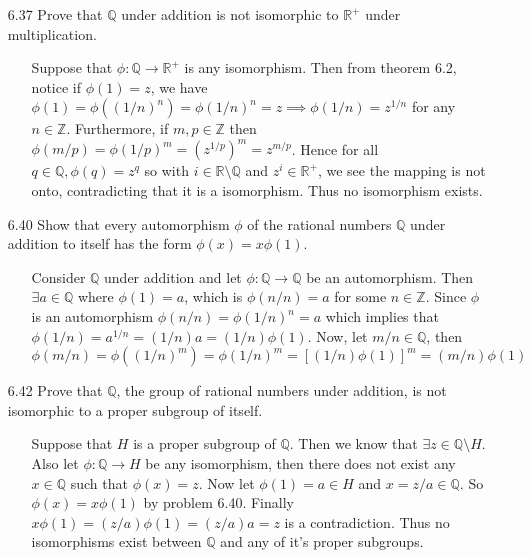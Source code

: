 \documentclass[12pt]{article}
\begin{document}
\begin{enumerate}
\item[6.37] Prove that $\mathbb{Q}$ under addition is not isomorphic to $\mathbb{R}^+$ under
multiplication.
\begin{enumerate}
\item[] Suppose that $\phi: \mathbb{Q} \rightarrow \mathbb{R}^+$ is any isomorphism. Then from
theorem 6.2, notice if $\phi(1) = z$, we have $\phi(1) = \phi((1/n)^n) = \phi(1/n)^n = z 
\implies \phi(1/n) = z^{1/n}$ for any $n \in \mathbb{Z}$. Furthermore, if $m, p \in \mathbb{Z}$
then $\phi(m/p) = \phi(1/p)^m = (z^{1/p})^m = z^{m/p}$. Hence for all $q \in \mathbb{Q}, 
\phi(q) = z^q$ so with $i \in \mathbb{R}\setminus \mathbb{Q}$ and $z^i \in \mathbb{R}^+$, we
see the mapping is not onto, contradicting that it is a isomorphism. Thus no isomorphism exists.
\end{enumerate}

\item[6.40] Show that every automorphism $\phi$ of the rational numbers $\mathbb{Q}$ under addition
to itself has the form $\phi(x) = x\phi(1)$.
\begin{enumerate}
\item[] Consider $\mathbb{Q}$ under addition and let $\phi: \mathbb{Q} \rightarrow \mathbb{Q}$
be an automorphism. Then $\exists a \in \mathbb{Q}$ where $\phi(1) = a$, which is
$\phi(n/n) = a$ for some $n \in \mathbb{Z}$. Since $\phi$ is an automorphism $\phi(n/n) = 
\phi(1/n)^n = a$ which implies that $\phi(1/n) = a^{1/n} = (1/n)a = (1/n)\phi(1)$. Now,
let $m/n \in \mathbb{Q}$, then
\[
\phi(m/n) = \phi((1/n)^m) = \phi(1/n)^m = [(1/n)\phi(1)]^m = (m/n)\phi(1)
\]
\end{enumerate}

\item[6.42] Prove that $\mathbb{Q}$, the group of rational numbers under addition, is not isomorphic to a proper subgroup of itself.
\begin{enumerate}
\item[] Suppose that $H$ is a proper subgroup of $\mathbb{Q}$. Then we know that
$\exists z \in \mathbb{Q}\setminus H$. Also let $\phi: \mathbb{Q} \rightarrow H$ be any
isomorphism, then there does not exist any $x \in \mathbb{Q}$ such that $\phi(x) = z$.
Now let $\phi(1) = a \in H$ and $x = z/a \in \mathbb{Q}$. So $\phi(x) = x\phi(1)$ by 
problem 6.40. Finally $x\phi(1) = (z/a)\phi(1) = (z/a)a = z$ is a contradiction. Thus
no isomorphisms exist between $\mathbb{Q}$ and any of it's proper subgroups.
\end{enumerate}


\end{enumerate}
\end{document}
